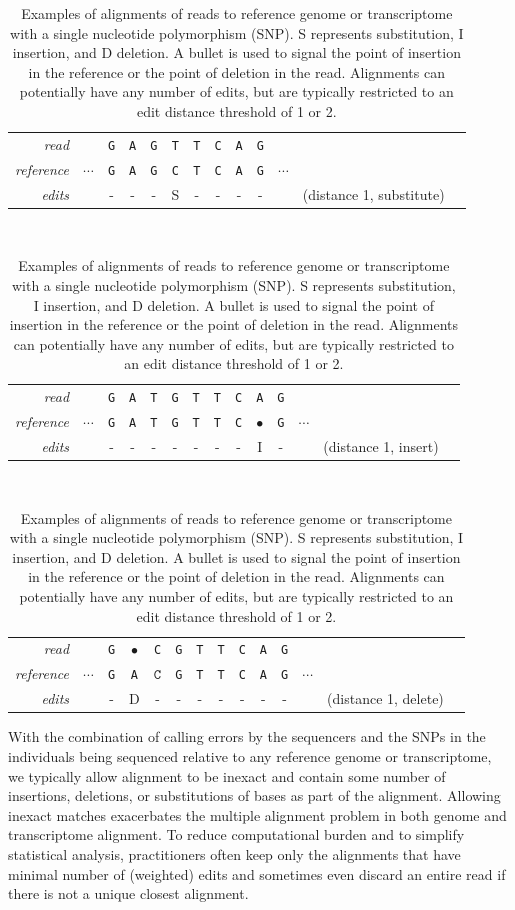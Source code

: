 \documentclass[11pt]{report}
\newcommand{\mybase}[1]{\texttt{#1}\xspace}
\newcommand{\baseA}{\mybase{A}}
\newcommand{\baseC}{\mybase{C}}
\newcommand{\baseG}{\mybase{G}}
\newcommand{\baseT}{\mybase{T}}
\newcommand{\mycaption}[2]{\caption{#2}\label{#1}}
\begin{document}
\begin{table}[t!]
  \centering\small
  \begin{tabular}{r|cccccccccccl}
    \textit{read} & & \baseG & \baseA & \baseG & \baseT & \baseT & \baseC & \baseA & \baseG
    \\
    \textit{reference} & $\cdots$ & \baseG & \baseA & \baseG & \baseC & \baseT & \baseC & \baseA & \baseG & $\cdots$
    \\ \hline
    \textit{edits} &  & - & - & - & \small S & - & - & - & - &  & \small (distance 1, substitute)
  \end{tabular}
  \\[12pt]
  \begin{tabular}{r|ccccccccccccl}
    \textit{read} & & \baseG & \baseA &\baseT & \baseG & \baseT & \baseT & \baseC & \baseA & \baseG &
    \\
    \textit{reference} & $\cdots$ & \baseG & \baseA & \baseT & \baseG & \baseT & \baseT & \baseC & $\bullet$ & \baseG & $\cdots$
    \\ \hline
    \textit{edits} & & - & - & - & - & - & - & - & \small I & - & & \small (distance 1, insert)
  \end{tabular}
  \\[12pt]
  \begin{tabular}{r|ccccccccccccl}
    \textit{read} & & \baseG & $\bullet$ & \baseC & \baseG & \baseT & \baseT & \baseC & \baseA & \baseG &
    \\
    \textit{reference} & $\cdots$ & \baseG & \baseA & $\baseC$ & \baseG & \baseT & \baseT & \baseC & \baseA & \baseG & $\cdots$
    \\ \hline
    \textit{edits} & & - & \small D & - & - & - & - & - & - & - & & \small (distance 1, delete)
  \end{tabular}
  \mycaption{tab:edit-distance}{Examples of alignments of reads to
    reference genome or transcriptome with a single nucleotide
    polymorphism (SNP). S represents substitution, I insertion, and D
    deletion. A bullet is used to signal the point of insertion in the
    reference or the point of deletion in the read. Alignments can
    potentially have any number of edits, but are typically restricted
    to an edit distance threshold of 1 or 2.}
\end{table}

With the combination of calling errors by the sequencers and the SNPs
in the individuals being sequenced relative to any reference genome or
transcriptome, we typically allow alignment to be inexact and contain
some number of insertions, deletions, or substitutions of bases as
part of the alignment. Allowing inexact matches exacerbates the
multiple alignment problem in both genome and transcriptome alignment.
To reduce computational burden and to simplify statistical analysis,
practitioners often keep only the alignments that have minimal number
of (weighted) edits and sometimes even discard an entire read if there
is not a unique closest alignment.
\end{document}
